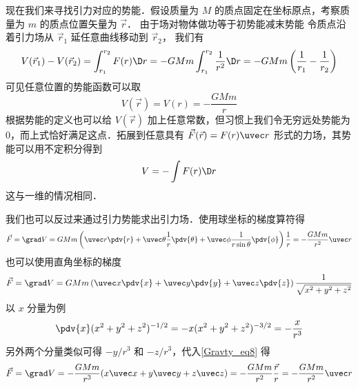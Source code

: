 现在我们来寻找引力对应的势能．假设质量为 $M$ 的质点固定在坐标原点，考察质量为 $m$ 的质点位置矢量为 $\vec r$． 由于场对物体做功等于初势能减末势能
令质点沿着引力场从 ${\vec r_1}$ 延任意曲线移动到 ${\vec r_2}$， 我们有
\begin{equation}
V(\vec r_1) - V(\vec r_2) = \int_{r_1}^{r_2} F(r)\D r =  - GMm\int_{r_1}^{r_2} \frac{1}{r^2}\D r  =  - GMm\left( \frac{1}{r_1} - \frac{1}{r_2} \right)
\end{equation}
可见任意位置的势能函数可以取
\begin{equation}
V(\vec r) = V(r) = - \frac{GMm}{r}
\end{equation}
根据势能的定义也可以给 $V(\vec r)$ 加上任意常数，但习惯上我们令无穷远处势能为 0，而上式恰好满足这点．拓展到任意具有 $\vec F(\vec r) = F(r)\uvec r$ 形式的力场，其势能可以用不定积分得到
\begin{equation}
V = -\int F(r) \D r
\end{equation}
这与一维的情况相同．%

我们也可以反过来通过引力势能求出引力场．使用球坐标的梯度算符得%
\begin{equation}
\vec F = \grad V = GMm\left( \uvec r\pdv{r} + \uvec \theta \frac{1}{r}\pdv{\theta} + \uvec \phi \frac{1}{r\sin \theta}\pdv{\phi} \right)\frac{1}{r} =  - \frac{GMm}{r^2}\uvec r
\end{equation}
也可以使用直角坐标的梯度
\begin{equation}\label{Gravty_eq8}
\vec F = \grad V = GMm\left(\uvec x\pdv{x} + \uvec y\pdv{y} + \uvec z\pdv{z} \right)\frac{1}{\sqrt{x^2 + y^2 + z^2}}
\end{equation}
以 $x$ 分量为例
\begin{equation}
\pdv{x}(x^2 + y^2 + z^2)^{-1/2} =  - x(x^2 + y^2 + z^2)^{-3/2} =  - \frac{x}{r^3}
\end{equation}
另外两个分量类似可得 $- y/r^3$ 和 $- z/r^3$，代入\autoref{Gravty_eq8} 得
\begin{equation}
\vec F = \grad V =  - \frac{GMm}{r^3} (x\uvec x + y\uvec y + z\uvec z) =  - \frac{GMm}{r^2}\frac{\vec r}{r} =  - \frac{GMm}{r^2}\uvec r
\end{equation}
